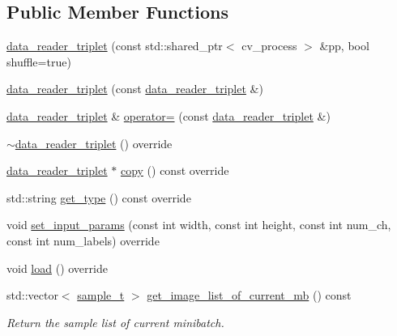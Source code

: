 \subsection*{Public Member Functions}
\begin{DoxyCompactItemize}
\item 
\hyperlink{classlbann_1_1data__reader__triplet_ab0d6db1085010ea95fa1c01eccce0e6c}{data\+\_\+reader\+\_\+triplet} (const std\+::shared\+\_\+ptr$<$ cv\+\_\+process $>$ \&pp, bool shuffle=true)
\item 
\hyperlink{classlbann_1_1data__reader__triplet_adf21708459fb3d4dbae1639ef02faeac}{data\+\_\+reader\+\_\+triplet} (const \hyperlink{classlbann_1_1data__reader__triplet}{data\+\_\+reader\+\_\+triplet} \&)
\item 
\hyperlink{classlbann_1_1data__reader__triplet}{data\+\_\+reader\+\_\+triplet} \& \hyperlink{classlbann_1_1data__reader__triplet_a096c73a8b3d163faadfee3b9d14fc842}{operator=} (const \hyperlink{classlbann_1_1data__reader__triplet}{data\+\_\+reader\+\_\+triplet} \&)
\item 
\hyperlink{classlbann_1_1data__reader__triplet_a55f298a4f0f1232325b0e8265e1a4e2f}{$\sim$data\+\_\+reader\+\_\+triplet} () override
\item 
\hyperlink{classlbann_1_1data__reader__triplet}{data\+\_\+reader\+\_\+triplet} $\ast$ \hyperlink{classlbann_1_1data__reader__triplet_aa390c4e801dfa367895ef0904daa0b77}{copy} () const override
\item 
std\+::string \hyperlink{classlbann_1_1data__reader__triplet_a7ff627eed9a4671129cbf7fb9ca11871}{get\+\_\+type} () const override
\item 
void \hyperlink{classlbann_1_1data__reader__triplet_a8172b4ac97d18b51814578a19a7f75c7}{set\+\_\+input\+\_\+params} (const int width, const int height, const int num\+\_\+ch, const int num\+\_\+labels) override
\item 
void \hyperlink{classlbann_1_1data__reader__triplet_a2601234d6d501df6170c6fb60dfb873e}{load} () override
\item 
std\+::vector$<$ \hyperlink{classlbann_1_1image__data__reader_a7580011ef6ef9da32e1a3bc49ad0706c}{sample\+\_\+t} $>$ \hyperlink{classlbann_1_1data__reader__triplet_a2fa95d7757541b63f5191c1ffa7b7112}{get\+\_\+image\+\_\+list\+\_\+of\+\_\+current\+\_\+mb} () const
\begin{DoxyCompactList}\small\item\em Return the sample list of current minibatch. \end{DoxyCompactList}\item 

\end{DoxyCompactItemize}
